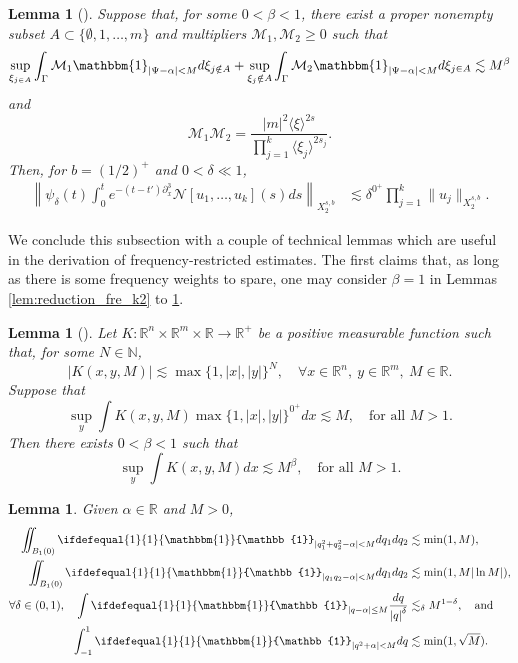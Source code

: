 \documentclass[%
11pt,  reqno]{amsart}
\newcommand{\jap}[1]{\langle #1 \rangle}
\newcommand{\5}{\textup{V}}
\newcommand{\m}[1]{
	\ifdefequal{#1}{1}
	{\mathbbm{#1}}
	{\mathbb{#1}}
}
\newcommand{\les}{\lesssim}
\newtheorem{lemma}[theorem]{Lemma}
\theoremstyle{remark}
\newcommand{\R}{\mathbb{R}}
\numberwithin{equation}{section}
\numberwithin{theorem}{section}
\newcommand{\Ncal}{\mathcal{N}}
\begin{document}
{		
		\begin{lemma}[{\cite[Lemma 2]{COS}}]\label{lem:fre_tri}
			Suppose that, for some $0<\beta<1$, there exist a proper nonempty subset $A\subset \{\emptyset,1,\dots, m\}$ and multipliers $\mathcal{M}_1,\mathcal{M}_2\ge 0$ such that
			$$
			\sup_{\xi_{j\in A}} \int_{\Gamma} \mathcal{M}_1 \mathbbm{1}_{|\Psi-\alpha|<M} d\xi_{j\notin A} + \sup_{\xi_ j\notin A} \int_{\Gamma} \mathcal{M}_2 \mathbbm{1}_{|\Psi-\alpha|<M} d\xi_{j\in A} \lesssim M^\beta
			$$
			and
			$$
			\mathcal{M}_1\mathcal{M}_2=\frac{|m|^2\jap{\xi}^{2s}}{\prod_{j=1}^k\jap{\xi_{j}}^{2s_j}}.
			$$
            Then, for $b=(1/2)^+$ and $0<\delta\ll 1$,
            \begin{align}
				\left\|\psi_\delta(t)\int_0^te^{-(t-t')\partial_x^3}\Ncal[u_1,\dots, u_k](s)ds \right\|_{X^{s,b}_{2}} & \les \delta^{0^+}\prod_{j=1}^k\|u_j\|_{X^{s,b}_{2}}.
			\end{align}
		\end{lemma}
		
		We conclude this subsection with a couple of technical lemmas which are useful in the derivation of frequency-restricted estimates. The first claims that, as long as there is some frequency weights to spare, one may consider $\beta=1$ in Lemmas \ref{lem:reduction_fre_k2} to \ref{lem:fre_tri}.
		
		\begin{lemma}[{\cite[Lemma 3.3]{CLS}}]\label{lem:eta1}
			Let $K:\R^n\times \R^m\times \R\to \R^+$ be a positive measurable function such that, for some $N\in \mathbb{N}$,
			$$
			|K(x,y,M)|\lesssim \max\{1,|x|,|y|\}^N,\quad \forall x\in\R^n,\ y\in \R^m, \ M\in \R.
			$$
			Suppose that
			$$
			\sup_y \int K(x,y,M)\max\{1,|x|,|y|\}^{0^+} dx \lesssim M,\quad \mbox{for all }M>1.
			$$
			Then there exists $0<\beta<1$ such that
			$$
			\sup_y \int K(x,y,M) dx \lesssim M^{\beta},\quad \mbox{for all } M>1.
			$$
		\end{lemma}
		
		
		\begin{lemma}\label{lem:quadraticas}
			Given $\alpha\in \R$ and $M>0$,
			\begin{align}\label{eq:posdef}
				\iint_{B_1(0)} \m 1_{|q_1^2+q_2^2-\alpha|<M}dq_1dq_2 &\lesssim \min(1,M), \\\label{eq:indef}
				\iint_{B_1(0)} \m 1_{|q_1q_2-\alpha|<M}dq_1dq_2 &\lesssim \min(1,M|\ln M|), \\
				\label{eq:singular}
				\forall \delta \in (0,1), \quad \int \m 1_{|q-\alpha| \le M} \frac{dq}{\left|q \right|^{\delta}} &\lesssim_{\delta} M^{1-\delta}, \quad \text{and} \quad \\
				\label{eq:quadratica}
				\int_{-1}^{1} \m 1_{|q^2  +\alpha | < M} dq &\lesssim \min(1,\sqrt M).
			\end{align}
			

\end{lemma}}
\end{document}
